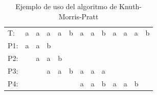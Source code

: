 \begin{table}[h]
\centering
\label{my-label6}
\begin{tabular}{lllllllllllll}
\cline{2-13}
\multicolumn{1}{l|}{T:} & \multicolumn{1}{l|}{a} & \multicolumn{1}{l|}{a} & \multicolumn{1}{l|}{a}                         & \multicolumn{1}{l|}{a}                         & \multicolumn{1}{l|}{b} & \multicolumn{1}{l|}{a}                         & \multicolumn{1}{l|}{a}                         & \multicolumn{1}{l|}{b}                         & \multicolumn{1}{l|}{a}                         & \multicolumn{1}{l|}{a}                         & \multicolumn{1}{l|}{a}                         & \multicolumn{1}{l|}{b} \\ \cline{2-13} 
\multicolumn{1}{l}{P1:}   & \multicolumn{1}{l}{a} & \multicolumn{1}{l}{a} & \multicolumn{1}{l}{\cellcolor[HTML]{FD6864}b} &                                                &                        &                                                &                                                &                                                &                                                &                                                &                                                &                        \\ 
P2:               & \multicolumn{1}{l}{}  & \multicolumn{1}{l}{a} & \multicolumn{1}{l}{a}                         & \multicolumn{1}{l}{\cellcolor[HTML]{FD6864}b} &                        &                                                &                                                &                                                &                                                &                                                &                                                &                        \\
  P3:                      &                        & \multicolumn{1}{l}{}  & \multicolumn{1}{l}{a}                         & \multicolumn{1}{l}{a}                         & \multicolumn{1}{l}{b} & \multicolumn{1}{l}{a}                         & \multicolumn{1}{l}{a}                         & \multicolumn{1}{l}{\cellcolor[HTML]{FD6864}a} &                                                &                                                &                                                &                        \\
 P4:                    &                        &                        &                                                &                                                & \multicolumn{1}{l}{}  & \multicolumn{1}{l}{\cellcolor[HTML]{9AFF99}a} & \multicolumn{1}{l}{\cellcolor[HTML]{9AFF99}a} & \multicolumn{1}{l}{\cellcolor[HTML]{9AFF99}b} & \multicolumn{1}{l}{\cellcolor[HTML]{9AFF99}a} & \multicolumn{1}{l}{\cellcolor[HTML]{9AFF99}a} & \multicolumn{1}{l}{\cellcolor[HTML]{9AFF99}b} &                        \\        
\end{tabular}
\caption{Ejemplo de uso del algoritmo de Knuth-Morris-Pratt}
\end{table}

